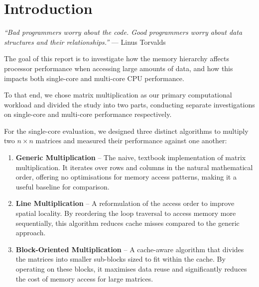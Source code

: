 \documentclass[12pt,a4paper]{article}
\begin{document}
\tableofcontents
\clearpage

\listoffigures
\clearpage

\listoftables
\clearpage

\section{Introduction}
\label{sec:intro}

\begin{center}
\textit{``Bad programmers worry about the code. Good programmers worry about
data structures and their relationships.''} --- Linus Torvalds
\end{center}

\medskip

The goal of this report is to investigate how the memory hierarchy affects
processor performance when accessing large amounts of data, and how this
impacts both single-core and multi-core CPU performance.

To that end, we chose matrix multiplication as our primary computational
workload and divided the study into two parts, conducting separate
investigations on single-core and multi-core performance respectively.

For the single-core evaluation, we designed three distinct algorithms to
multiply two $n \times n$ matrices and measured their performance against one
another:

\begin{enumerate}
  \item \textbf{Generic Multiplication} -- The naive, textbook implementation
        of matrix multiplication. It iterates over rows and columns in the
        natural mathematical order, offering no optimisations for memory access
        patterns, making it a useful baseline for comparison.
  \item \textbf{Line Multiplication} -- A reformulation of the access order to
        improve spatial locality. By reordering the loop traversal to access
        memory more sequentially, this algorithm reduces cache misses compared
        to the generic approach.
  \item \textbf{Block-Oriented Multiplication} -- A cache-aware algorithm that
        divides the matrices into smaller sub-blocks sized to fit within the
        cache. By operating on these blocks, it maximises data reuse and
        significantly reduces the cost of memory access for large matrices.
\end{enumerate}
\end{document}
